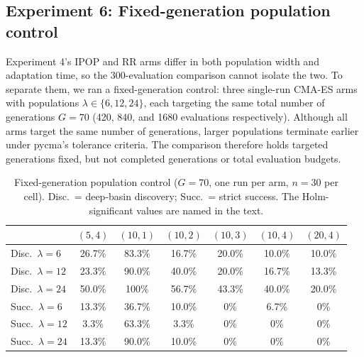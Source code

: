 \documentclass[11pt,a4paper]{article}
\begin{document}
\subsection{Experiment 6: Fixed-generation population control}\label{sec:fixedgen}
Experiment 4's IPOP and RR arms differ in both population width and adaptation time, so the 300-evaluation comparison cannot isolate the two. To separate them, we ran a fixed-generation control: three single-run CMA-ES arms with populations $\lambda\in\{6,12,24\}$, each targeting the same total number of generations $G=70$ (420, 840, and 1680 evaluations respectively). Although all arms target the same number of generations, larger populations terminate earlier under pycma's tolerance criteria. The comparison therefore holds targeted generations fixed, but not completed generations or total evaluation budgets.

\begin{table}[!htbp]
\centering\footnotesize
\begin{tabular}{@{}lcccccc@{}}
\toprule
 & $(5,4)$ & $(10,1)$ & $(10,2)$ & $(10,3)$ & $(10,4)$ & $(20,4)$\\
\midrule
Disc.\ $\lambda=6$  & 26.7\% & 83.3\% & 16.7\% & 20.0\% & 10.0\% & 10.0\% \\
Disc.\ $\lambda=12$ & 23.3\% & 90.0\% & 40.0\% & 20.0\% & 16.7\% & 13.3\% \\
Disc.\ $\lambda=24$ & 50.0\% & 100\%  & 56.7\% & 43.3\% & 40.0\% & 20.0\% \\
\midrule
Succ.\ $\lambda=6$  & 13.3\% & 36.7\% & 10.0\% & 0\%    & 6.7\%  & 0\% \\
Succ.\ $\lambda=12$ & 3.3\%  & 63.3\% & 3.3\%  & 0\%    & 0\%    & 0\% \\
Succ.\ $\lambda=24$ & 13.3\% & 90.0\% & 10.0\% & 0\%    & 0\%    & 0\% \\
\bottomrule
\end{tabular}
\caption{Fixed-generation population control ($G=70$, one run per arm, $n=30$ per cell). Disc.\ = deep-basin discovery; Succ.\ = strict success. The Holm-significant values are named in the text.}
\label{tab:fixedgen}
\end{table}
\end{document}
